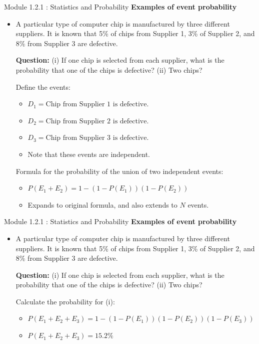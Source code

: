 \documentclass{beamer}
\begin{document}
\begin{frame}{Module 1.2.1 : Statistics and Probability}
\small
\textbf{Examples of event probability}
\begin{itemize}
\item
\scriptsize
A particular type of computer chip is manufactured by three different suppliers.  It is known that 5\% of chips from Supplier 1, 3\% of Supplier 2, and 8\% from Supplier 3 are defective. \\ \vspace{0.25cm}

\textbf{Question:} (i) If one chip is selected from each supplier, what is the probability that one of the chips is defective? (ii) Two chips? \\ \vspace{0.25cm}

Define the events:
\begin{itemize}
\scriptsize
\item $D_1 = \text{Chip from Supplier 1 is defective.}$
\item $D_2 = \text{Chip from Supplier 2 is defective.}$
\item $D_3 = \text{Chip from Supplier 3 is defective.}$
\item Note that these events are independent.
\end{itemize}
Formula for the probability of the union of two independent events:
\begin{itemize}
\scriptsize
\item $P(E_1 + E_2) = 1-(1-P(E_1))(1-P(E_2))$
\item Expands to original formula, and also extends to $N$ events.
\end{itemize}
\end{itemize}
\end{frame}

\begin{frame}{Module 1.2.1 : Statistics and Probability}
\small
\textbf{Examples of event probability}
\begin{itemize}
\item
\scriptsize
A particular type of computer chip is manufactured by three different suppliers.  It is known that 5\% of chips from Supplier 1, 3\% of Supplier 2, and 8\% from Supplier 3 are defective. \\ \vspace{0.25cm}

\textbf{Question:} (i) If one chip is selected from each supplier, what is the probability that one of the chips is defective? (ii) Two chips? \\ \vspace{0.25cm}

Calculate the probability for (i):
\begin{itemize}
\scriptsize
\item $P(E_1 + E_2 + E_3) = 1-(1-P(E_1))(1-P(E_2))(1-P(E_3))$
\item $P(E_1 + E_2 + E_3) = 15.2\%$
\end{itemize}
\end{itemize}
\end{frame}
\end{document}
